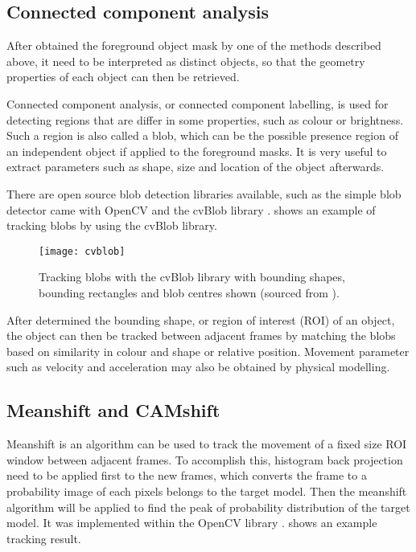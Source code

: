 \subsection{Connected component analysis}
\label{blob}

After obtained the foreground object mask by one of the methods described above, it need to be interpreted as distinct objects, so that the geometry properties of each object can then be retrieved.

Connected component analysis, or connected component labelling, is used for detecting regions that are differ in some properties, such as colour or brightness. Such a region is also called a blob, which can be the possible presence region of an independent object if applied to the foreground masks. It is very useful to extract parameters such as shape, size and location of the object afterwards.

There are open source blob detection libraries available, such as the simple blob detector came with OpenCV \cite{opencv:blob} and the cvBlob library \cite{cvblob}.  shows an example of tracking blobs by using the cvBlob library.


\begin{figure}[H]
  \centering
  \texttt{[image: cvblob]}
  \caption{Tracking blobs with the cvBlob library with bounding shapes, bounding rectangles and blob centres shown (sourced from \cite{cvblob}).}
  \label{cvblob}
\end{figure}

After determined the bounding shape, or region of interest (ROI) of an object, the object can then be tracked between adjacent frames by matching the blobs based on similarity in colour and shape or relative position. Movement parameter such as velocity and acceleration may also be obtained by physical modelling.

\subsection{Meanshift and CAMshift}

Meanshift \cite{fukunaga2013introduction} is an algorithm can be used to track the movement of a fixed size ROI window between adjacent frames. To accomplish this, histogram back projection need to be applied first to the new frames, which converts the frame to a probability image of each pixels belongs to the target model. Then the meanshift algorithm will be applied to find the peak of probability distribution of the target model. It was implemented within the OpenCV library \cite{opencv:camshift}.  shows an example tracking result.

